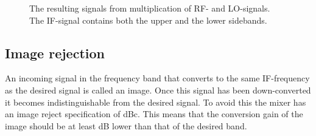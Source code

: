 			\begin{figure}[hpt!]
				\centering 
				\caption{The resulting signals from multiplication of RF- and LO-signals. The IF-signal contains both the upper and the lower sidebands.}\label{fig:mixing_function}
			\end{figure}
			
		\subsection{Image rejection}
			An incoming signal in the frequency band that converts to the same IF-frequency as the desired signal is called an image. Once this signal has been down-converted it becomes indistinguishable from the desired signal. To avoid this the mixer has an image reject specification of \unit[30]{dBc}. This means that the conversion gain of the image should be at least \unit[30]{dB} lower than that of the desired band.
			
